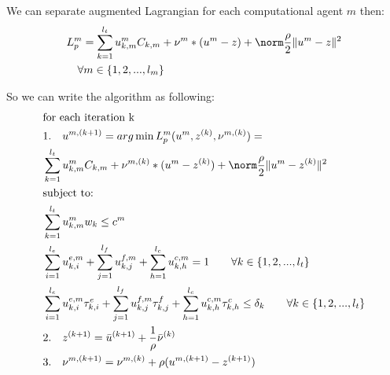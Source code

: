\documentclass[conference]{IEEEtran}
\begin{document}
    We can separate augmented Lagrangian for each computational agent $m$ then:
    \begin{subequations}
      \begin{align}
        &L_p^m = \sum_{k=1}^{l_t} u_{k,m}^{m} C_{k,m}
        + \nu^m*(u^m-z) + \norm\frac{\rho}{2} \|u^m-z\|^2 \\ \notag
        &\quad \forall m\in\{1,2,...,l_m\}
      \end{align}
    \end{subequations}

    So we can write the algorithm as following:
    \begin{subequations}
      \begin{align}
        &\text{for each iteration k} \\ \notag
        &\text{1.\quad}u^{m,(k+1)} = arg \min {L_p^m(u^{m}, z^{(k)}, \nu^{m,(k)})} = \\ \notag
        &\sum_{k=1}^{l_t} u_{k,m}^{m} C_{k,m}
        + \nu^{m,(k)}*(u^m-z^{(k)}) + \norm\frac{\rho}{2} \|u^m-z^{(k)}\|^2 \\ \notag
        &\text{subject to:} \\ \notag
        &\sum_{k=1}^{l_t}{u_{k,m}^m w_k} \le c^m \\ \notag
        &\sum_{i=1}^{l_e}u_{k,i}^{e,m}+\sum_{j=1}^{l_f}u_{k,j}^{f,m}+\sum_{h=1}^{l_c}u_{k,h}^{c,m}=1 \quad\quad \forall k\in\{1,2,...,l_t\} \\ \notag
        &\sum_{i=1}^{l_e}u_{k,i}^{e,m}\tau_{k,i}^e
        +\sum_{j=1}^{l_f}u_{k,j}^{f,m}\tau_{k,j}^f
        +\sum_{h=1}^{l_c}u_{k,h}^{c,m}\tau_{k,h}^c
        \le \delta_k \quad\quad \forall k\in\{1,2,...,l_t\} \\ \notag
        &\text{2.\quad}{z}^{(k+1)} = \bar{u}^{(k+1)} + \frac{1}{\rho}\bar{\nu}^{(k)} \\ \notag
        &\text{3.\quad}{\nu}^{m,(k+1)} = \nu^{m,(k)} + \rho(u^{m,(k+1)} - z^{(k+1)})
      \end{align}
    \end{subequations}
\end{document}
